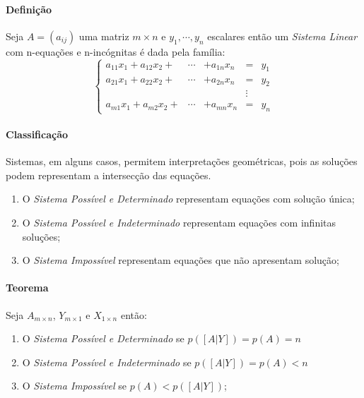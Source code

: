 \documentclass{article}
\begin{document}
            \paragraph{Definição}Seja $A=(a_{ij})$ uma matriz $m \times n$ e $y_{1}, \cdots, y_{n}$ escalares então um \textit{Sistema Linear} com n-equações e n-incógnitas é dada pela família:
                \[
                    \left\{
                    \begin{matrix}
                        a_{11}x_{1} + a_{12}x_{2} + & \cdots & + a_{1n}x_{n} & =      & y_{1}\\
                        a_{21}x_{1} + a_{22}x_{2} + & \cdots & + a_{2n}x_{n} & =      & y_{2}\\
                                                    &        &               & \vdots & \\
                        a_{m1}x_{1} + a_{m2}x_{2} + & \cdots & + a_{mn}x_{n} & =      & y_{n}
                    \end{matrix}
                    \right.
                \]

            \paragraph{Classificação}Sistemas, em alguns casos, permitem interpretações geométricas, pois as soluções podem representam a intersecção das equações.
                \begin{enumerate}[noitemsep]
                    \item O \textit{Sistema Possível e Determinado} representam equações com solução única;
                    \item O \textit{Sistema Possível e Indeterminado} representam equações com infinitas soluções;
                    \item O \textit{Sistema Impossível} representam equações que não apresentam solução;
                \end{enumerate}
            
            \paragraph{Teorema}Seja $A_{m \times n}$, $Y_{m \times 1}$ e $X_{1 \times n}$ então:
                \begin{enumerate}[noitemsep]
                    \item O \textit{Sistema Possível e Determinado} se $p([A|Y])=p(A)=n$
                    \item O \textit{Sistema Possível e Indeterminado} se $p([A|Y])=p(A)<n$
                    \item O \textit{Sistema Impossível} se $p(A)<p([A|Y])$;
                \end{enumerate}
\newpage
\end{document}
